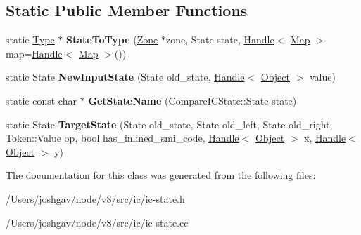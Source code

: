 \subsection*{Static Public Member Functions}
\begin{DoxyCompactItemize}
\item 
static \hyperlink{classv8_1_1internal_1_1_type}{Type} $\ast$ {\bfseries State\+To\+Type} (\hyperlink{classv8_1_1internal_1_1_zone}{Zone} $\ast$zone, State state, \hyperlink{classv8_1_1internal_1_1_handle}{Handle}$<$ \hyperlink{classv8_1_1internal_1_1_map}{Map} $>$ map=\hyperlink{classv8_1_1internal_1_1_handle}{Handle}$<$ \hyperlink{classv8_1_1internal_1_1_map}{Map} $>$())\hypertarget{classv8_1_1internal_1_1_compare_i_c_state_aaa18a8a5f935b9c920ce20ef3a99086e}{}\label{classv8_1_1internal_1_1_compare_i_c_state_aaa18a8a5f935b9c920ce20ef3a99086e}

\item 
static State {\bfseries New\+Input\+State} (State old\+\_\+state, \hyperlink{classv8_1_1internal_1_1_handle}{Handle}$<$ \hyperlink{classv8_1_1internal_1_1_object}{Object} $>$ value)\hypertarget{classv8_1_1internal_1_1_compare_i_c_state_ada8c6bd05a44ff13d797d169e9315e42}{}\label{classv8_1_1internal_1_1_compare_i_c_state_ada8c6bd05a44ff13d797d169e9315e42}

\item 
static const char $\ast$ {\bfseries Get\+State\+Name} (Compare\+I\+C\+State\+::\+State state)\hypertarget{classv8_1_1internal_1_1_compare_i_c_state_a6332f083efd33bbeb7402d48948d2776}{}\label{classv8_1_1internal_1_1_compare_i_c_state_a6332f083efd33bbeb7402d48948d2776}

\item 
static State {\bfseries Target\+State} (State old\+\_\+state, State old\+\_\+left, State old\+\_\+right, Token\+::\+Value op, bool has\+\_\+inlined\+\_\+smi\+\_\+code, \hyperlink{classv8_1_1internal_1_1_handle}{Handle}$<$ \hyperlink{classv8_1_1internal_1_1_object}{Object} $>$ x, \hyperlink{classv8_1_1internal_1_1_handle}{Handle}$<$ \hyperlink{classv8_1_1internal_1_1_object}{Object} $>$ y)\hypertarget{classv8_1_1internal_1_1_compare_i_c_state_af703a65c8d772566e7440d8d34a3c46f}{}\label{classv8_1_1internal_1_1_compare_i_c_state_af703a65c8d772566e7440d8d34a3c46f}

\end{DoxyCompactItemize}


The documentation for this class was generated from the following files\+:\begin{DoxyCompactItemize}
\item 
/\+Users/joshgav/node/v8/src/ic/ic-\/state.\+h\item 
/\+Users/joshgav/node/v8/src/ic/ic-\/state.\+cc\end{DoxyCompactItemize}
